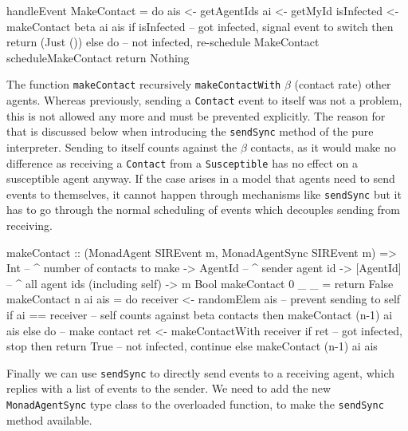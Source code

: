 \begin{HaskellCode}
handleEvent MakeContact = do
  ais        <- getAgentIds
  ai         <- getMyId
  isInfected <- makeContact beta ai ais
  if isInfected
    -- got infected, signal event to switch
    then return (Just ())
    else do
      -- not infected, re-schedule MakeContact
      scheduleMakeContact
      return Nothing
\end{HaskellCode}

The function \texttt{makeContact} recursively \texttt{makeContactWith} $\beta$ (contact rate) other agents. Whereas previously, sending a \texttt{Contact} event to itself was not a problem, this is not allowed any more and must be prevented explicitly. The reason for that is discussed below when introducing the \texttt{sendSync} method of the pure interpreter. Sending to itself counts against the $\beta$ contacts, as it would make no difference as receiving a \texttt{Contact} from a \texttt{Susceptible} has no effect on a susceptible agent anyway. If the case arises in a model that agents need to send events to themselves, it cannot happen through mechanisms like \texttt{sendSync} but it has to go through the normal scheduling of events which decouples sending from receiving.

\begin{HaskellCode}
makeContact :: (MonadAgent SIREvent m, MonadAgentSync SIREvent m)
            => Int       -- ^ number of contacts to make
            -> AgentId   -- ^ sender agent id
            -> [AgentId] -- ^ all agent ids (including self)
            -> m Bool
makeContact 0 _ _ = return False
makeContact n ai ais = do
  receiver <- randomElem ais
  -- prevent sending to self
  if ai == receiver
    -- self counts against beta contacts
    then makeContact (n-1) ai ais
    else do
      -- make contact
      ret <- makeContactWith receiver
      if ret
        -- got infected, stop
        then return True
        -- not infected, continue
        else makeContact (n-1) ai ais
\end{HaskellCode}

Finally we can use \texttt{sendSync} to directly send events to a receiving agent, which replies with a list of events to the sender. We need to add the new \texttt{MonadAgentSync} type class to the overloaded function, to make the \texttt{sendSync} method available.

